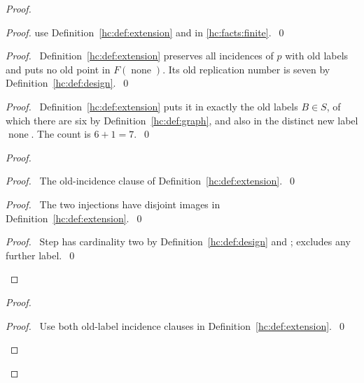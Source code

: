 \begin{mergedproofsection}
\begin{proof}
\begin{proof}
  use Definition~\ref{hc:def:extension} and
   in \ref{hc:facts:finite}.~\qed\end{proof}
 \begin{proof}\pf\ Definition~\ref{hc:def:extension} preserves all
  incidences of $p$ with old labels and puts no old point in $F(\operatorname{none})$.
  Its old replication number is seven by Definition~\ref{hc:def:design}.~\qed\end{proof}
 \begin{proof}\pf\ Definition~\ref{hc:def:extension} puts it in
  exactly the old labels $B\in S$, of which there are six by
  Definition~\ref{hc:def:graph}, and also in the distinct new
  label $\operatorname{none}$. The count is $6+1=7$.~\qed\end{proof}
 \begin{proof}
  \begin{proof}\pf\ The old-incidence clause of
   Definition~\ref{hc:def:extension}.~\qed\end{proof}
  \begin{proof}\pf\ The two injections have disjoint images in
   Definition~\ref{hc:def:extension}.~\qed\end{proof}
  \qedstep
  \begin{proof}\pf\ Step  has cardinality two
   by Definition~\ref{hc:def:design} and ;
    excludes any further label.~\qed\end{proof}
 \end{proof}
 \begin{proof}
  \begin{proof}\pf\ Use both old-label incidence clauses in
   Definition~\ref{hc:def:extension}.~\qed\end{proof}

\end{proof}
\end{proof}
\end{mergedproofsection}
